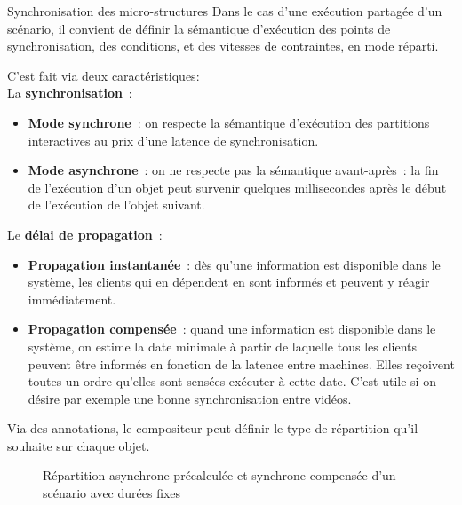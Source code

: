 \begin{block}{Synchronisation des micro-structures}
    Dans le cas d'une exécution partagée d'un scénario, il convient de définir la sémantique d'exécution des points de synchronisation, des conditions, et des vitesses de contraintes, en mode réparti. 
   
    C'est fait via deux caractéristiques:~\\
    La \textbf{synchronisation}~:
	\begin{itemize}
		\item \textbf{Mode synchrone}~: on respecte la sémantique d'exécution des partitions interactives au prix d'une latence de synchronisation.
		\item \textbf{Mode asynchrone}~: on ne respecte pas la sémantique avant-après~: la fin de l'exécution d'un objet peut survenir quelques millisecondes après le début de l'exécution de l'objet suivant.
	\end{itemize}

Le \textbf{délai de propagation}~:
\begin{itemize}
    \item \textbf{Propagation instantanée}~: dès qu'une information est disponible dans le système, les clients qui en dépendent en sont informés et peuvent y réagir immédiatement. 
    \item \textbf{Propagation compensée}~: quand une information est disponible dans le système, on estime la date minimale à partir de laquelle tous les clients peuvent être informés en fonction de la latence entre machines. Elles reçoivent toutes un ordre qu'elles sont sensées exécuter à cette date. C'est utile si on désire par exemple une bonne synchronisation entre vidéos.
\end{itemize}

Via des annotations, le compositeur peut définir le type de répartition qu'il souhaite sur chaque objet.

\begin{figure}
	\begin{tikzpicture}[scale=4]
	
	\end{tikzpicture}
	\begin{tikzpicture}[scale=4]
	
	\end{tikzpicture}
	\begin{tikzpicture}[scale=4]
	
	\end{tikzpicture}
	\caption{Répartition asynchrone précalculée et synchrone compensée d'un scénario avec durées fixes}
\end{figure}
\end{block}